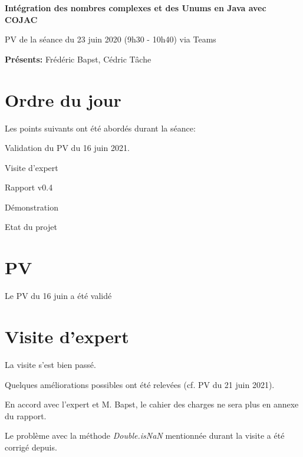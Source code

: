 \documentclass[11pt]{meetingmins}
\date{23 juin 2021}
\begin{document}
\begin {center} {
    \large \textbf {Intégration des nombres complexes et des Unums en Java avec COJAC}
}
\vspace {0.5ex}

PV de la séance du 23 juin 2020 (9h30 - 10h40) via Teams
\end {center} \vspace {1.5em}

\noindent
\textbf{Présents:} Frédéric Bapst, Cédric Tâche

\section{Ordre du jour}
Les points suivants ont été abordés durant la séance:
\begin{hiddenitems}
    \item Validation du PV du 16 juin 2021.
    \item Visite d'expert
    \item Rapport v0.4
    \item Démonstration
    \item Etat du projet
\end{hiddenitems}

\section{PV}
\begin{hiddenitems}
    \item Le PV du 16 juin a été validé
\end{hiddenitems}

\section{Visite d'expert}
\begin{hiddenitems}
    \item La visite s'est bien passé.
    \item Quelques améliorations possibles ont été relevées (cf. PV du 21 juin 2021).
    \item En accord avec l'expert et M. Bapst, le cahier des charges ne sera plus en annexe du rapport.
    \item Le problème avec la méthode \textit{Double.isNaN} mentionnée durant la visite a été corrigé depuis.
\end{hiddenitems}
\end{document}
